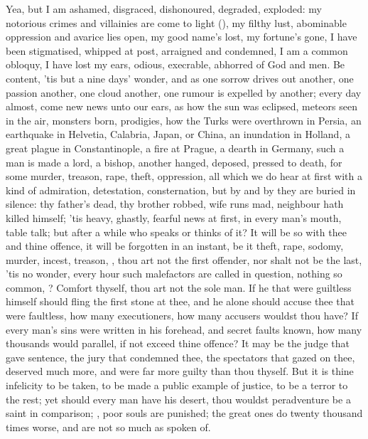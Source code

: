 {Yea, but I am ashamed, disgraced, dishonoured, degraded, exploded: my notorious crimes and villainies are come to light (), my filthy lust, abominable oppression and avarice lies open, my good name's lost, my fortune's gone, I have been stigmatised, whipped at post, arraigned and condemned, I am a common obloquy, I have lost my ears, odious, execrable, abhorred of God and men. Be content, 'tis but a nine days' wonder, and as one sorrow drives out another, one passion another, one cloud another, one rumour is expelled by another; every day almost, come new news unto our ears, as how the sun was eclipsed, meteors seen in the air, monsters born, prodigies, how the Turks were overthrown in Persia, an earthquake in Helvetia, Calabria, Japan, or China, an inundation in Holland, a great plague in Constantinople, a fire at Prague, a dearth in Germany, such a man is made a lord, a bishop, another hanged, deposed, pressed to death, for some murder, treason, rape, theft, oppression, all which we do hear at first with a kind of admiration, detestation, consternation, but by and by they are buried in silence: thy father's dead, thy brother robbed, wife runs mad, neighbour hath killed himself; 'tis heavy, ghastly, fearful news at first, in every man's mouth, table talk; but after a while who speaks or thinks of it? It will be so with thee and thine offence, it will be forgotten in an instant, be it theft, rape, sodomy, murder, incest, treason, \etc{}, thou art not the first offender, nor shalt not be the last, 'tis no wonder, every hour such malefactors are called in question, nothing so common, ? Comfort thyself, thou art not the sole man. If he that were guiltless himself should fling the first stone at thee, and he alone should accuse thee that were faultless, how many executioners, how many accusers wouldst thou have? If every man's sins were written in his forehead, and secret faults known, how many thousands would parallel, if not exceed thine offence? It may be the judge that gave sentence, the jury that condemned thee, the spectators that gazed on thee, deserved much more, and were far more guilty than thou thyself. But it is thine infelicity to be taken, to be made a public example of justice, to be a terror to the rest; yet should every man have his desert, thou wouldst peradventure be a saint in comparison; , poor souls are punished; the great ones do twenty thousand times worse, and are not so much as spoken of.

}
